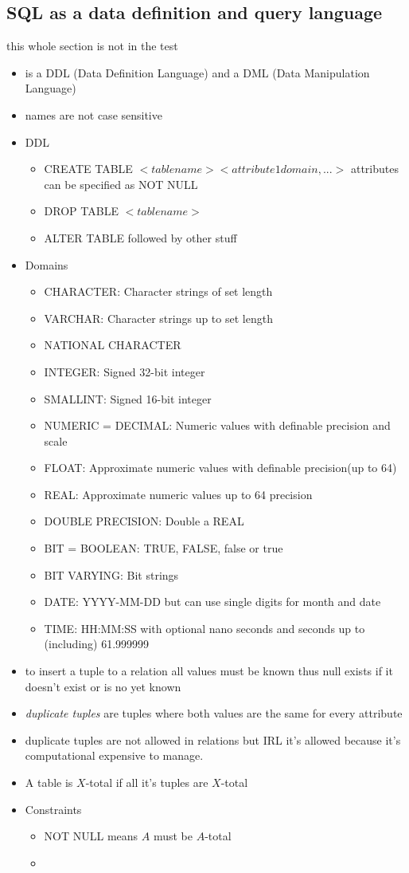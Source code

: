 \documentclass[10pt,a4paper]{article}
\begin{document}
	\subsection{SQL as a data definition and query language}
	this whole section is not in the test
		\begin{itemize}
			\item is a DDL (Data Definition Language) and a DML (Data Manipulation Language)
			\item names are not case sensitive
			\item DDL
			\begin{itemize}
				\item CREATE TABLE $<table name> <attribute1 domain, ...>$ attributes can be specified as NOT NULL
				\item DROP TABLE $<table name>$
				\item ALTER TABLE followed by other stuff
			\end{itemize}
			\item Domains
			\begin{itemize}
				\item CHARACTER: Character strings of set length
				\item VARCHAR: Character strings up to set length
				\item NATIONAL CHARACTER
				\item INTEGER: Signed 32-bit integer
				\item SMALLINT: Signed 16-bit integer
				\item NUMERIC = DECIMAL: Numeric values with definable precision and scale
				\item FLOAT: Approximate numeric values with definable precision(up to 64)
				\item REAL: Approximate numeric values up to 64 precision
				\item DOUBLE PRECISION: Double a REAL
				\item BIT = BOOLEAN: TRUE, FALSE, false or true
				\item BIT VARYING: Bit strings
				\item DATE: YYYY-MM-DD but can use single digits for month and date
				\item TIME: HH:MM:SS with optional nano seconds and seconds up to (including) 61.999999
			\end{itemize}
			\item to insert a tuple to a relation all values must be known thus null exists if it doesn't exist or is no yet known
			\item \textit{duplicate tuples} are tuples where both values are the same for every attribute
			\item duplicate tuples are not allowed in relations but IRL it's allowed because it's computational expensive to manage.
			\item A table is $X$-total if all it's tuples are $X$-total
			\item Constraints
			\begin{itemize}
				\item NOT NULL means $A$ must be $A$-total
				\item 
			\end{itemize}			
		\end{itemize}
\end{document}
